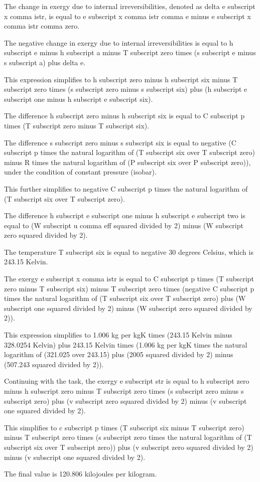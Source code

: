The change in exergy due to internal irreversibilities, denoted as delta e subscript x comma istr, is equal to e subscript x comma istr comma e minus e subscript x comma istr comma zero.

The negative change in exergy due to internal irreversibilities is equal to h subscript e minus h subscript a minus T subscript zero times (s subscript e minus s subscript a) plus delta e.

This expression simplifies to h subscript zero minus h subscript six minus T subscript zero times (s subscript zero minus s subscript six) plus (h subscript e subscript one minus h subscript e subscript six).

The difference h subscript zero minus h subscript six is equal to C subscript p times (T subscript zero minus T subscript six).

The difference s subscript zero minus s subscript six is equal to negative (C subscript p times the natural logarithm of (T subscript six over T subscript zero) minus R times the natural logarithm of (P subscript six over P subscript zero)), under the condition of constant pressure (isobar).

This further simplifies to negative C subscript p times the natural logarithm of (T subscript six over T subscript zero).

The difference h subscript e subscript one minus h subscript e subscript two is equal to (W subscript u comma eff squared divided by 2) minus (W subscript zero squared divided by 2).

The temperature T subscript six is equal to negative 30 degrees Celsius, which is 243.15 Kelvin.

The exergy e subscript x comma istr is equal to C subscript p times (T subscript zero minus T subscript six) minus T subscript zero times (negative C subscript p times the natural logarithm of (T subscript six over T subscript zero) plus (W subscript one squared divided by 2) minus (W subscript zero squared divided by 2)).

This expression simplifies to 1.006 kg per kgK times (243.15 Kelvin minus 328.0254 Kelvin) plus 243.15 Kelvin times (1.006 kg per kgK times the natural logarithm of (321.025 over 243.15) plus (2005 squared divided by 2) minus (507.243 squared divided by 2)).

Continuing with the task, the exergy e subscript str is equal to h subscript zero minus h subscript zero minus T subscript zero times (s subscript zero minus s subscript zero) plus (v subscript zero squared divided by 2) minus (v subscript one squared divided by 2).

This simplifies to c subscript p times (T subscript six minus T subscript zero) minus T subscript zero times (s subscript zero times the natural logarithm of (T subscript six over T subscript zero)) plus (v subscript zero squared divided by 2) minus (v subscript one squared divided by 2).

The final value is 120.806 kilojoules per kilogram.